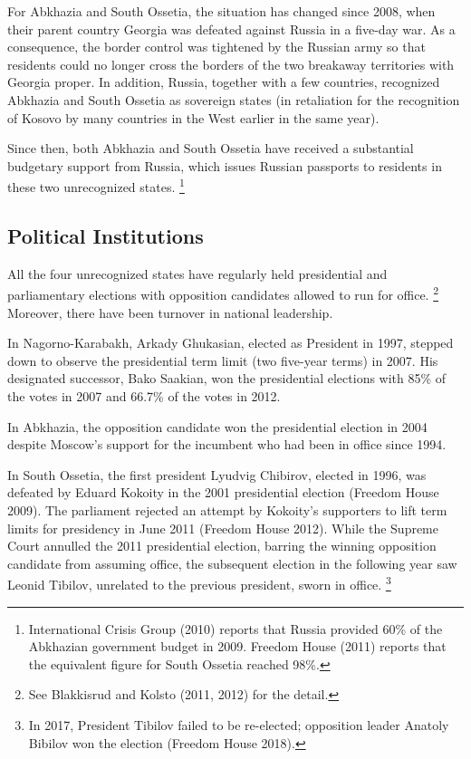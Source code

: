 \documentclass[12pt,a4paper]{article}%
\begin{document}
For Abkhazia and South Ossetia, the situation has changed since 2008, when their parent country Georgia was defeated against Russia in a five-day war. 
As a consequence, the border control was tightened by the Russian army so that residents could no longer cross the borders of the two breakaway territories with Georgia proper.
In addition, Russia, together with a few countries, recognized Abkhazia and South Ossetia as sovereign states (in retaliation for the recognition of Kosovo by many countries in the West earlier in the same year).

Since then, both Abkhazia and South Ossetia have received a substantial budgetary support from Russia, which issues Russian passports to residents in these two unrecognized states.%
\footnote{
	International Crisis Group (2010) reports that Russia provided 60\% of the Abkhazian government budget in 2009.
	Freedom House (2011) reports that the equivalent figure for South Ossetia reached 98\%.
} 

\subsection{Political Institutions}
All the four unrecognized states have regularly held presidential and parliamentary elections with opposition candidates allowed to run for office.%
\footnote{
	See Blakkisrud and Kolsto (2011, 2012) for the detail.
}
Moreover, there have been turnover in national leadership.

In Nagorno-Karabakh, Arkady Ghukasian, elected as President in 1997, stepped down to observe the presidential term limit (two five-year terms) in 2007. His designated successor, Bako Saakian, won the presidential elections with 85\% of the votes in 2007 and 66.7\% of the votes in 2012.

In Abkhazia, the opposition candidate won the presidential election in 2004 despite Moscow's support for the incumbent who had been in office since 1994. 

In South Ossetia, the first president Lyudvig Chibirov, elected in 1996, was defeated by Eduard Kokoity in the 2001 presidential election (Freedom House 2009).
The parliament rejected an attempt by Kokoity's supporters to lift term limits for presidency in June 2011 (Freedom House 2012).
While the Supreme Court annulled the 2011 presidential election, barring the winning opposition candidate from assuming office, the subsequent election in the following year saw Leonid Tibilov, unrelated to the previous president, sworn in office.%
\footnote{
	In 2017, President Tibilov failed to be re-elected; opposition leader Anatoly Bibilov won the election (Freedom House 2018).
} 
\end{document}
